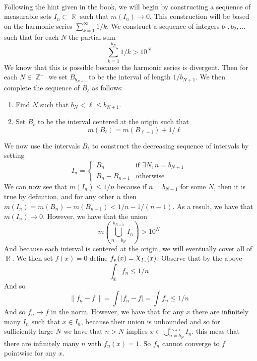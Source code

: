 \documentclass{article}
\DeclareMathOperator{\Z}{\mathbb{Z}}
\DeclareMathOperator{\R}{\mathbb{R}}
\DeclareMathOperator{\capchi}{\raisebox{2pt}{$\mathlarger{\mathlarger{\chi}}$}}
\newcommand{\problem}[1]{\noindent{\textbf{Problem #1}}\\}
\begin{document}
\problem{2.5.12} Following the hint given in the book, we will begin by constructing a sequence of measurable sets $I_n \subset \R$ such that $m(I_n) \to 0$. This construction will be based on the harmonic series $\sum_{k=1}^\infty 1/k$. We construct a sequence of integers $b_1,b_2,\ldots$ such that for each $N$ the partial sum
\[
\sum_{k=1}^{b_N} 1/k > 10^N
\]
We know that this is possible because the harmonic series is divergent. Then for each $N \in \Z^+$ we set $B_{b_{N+1}}$ to be the interval of length $1/b_{N+1}$. We then complete the sequence of $B_\ell$ as follows: 
\begin{enumerate}
\item Find $N$ such that $b_N < \ell \leq b_{N+1}$.
\item Set $B_\ell$ to be the interval centered at the origin such that 
\[
m(B_\ell) = m(B_{\ell-1}) + 1/\ell
\]
\end{enumerate}  
We now use the intervals $B_\ell$ to construct the decreasing sequence of intervals by setting
\[
I_n = 
\begin{cases}
B_n & \text{if }\exists N,  n = b_{N+1} \\
B_n - B_{n-1} & \text{otherwise}
\end{cases}
\]
We can now see that $m(I_n) \leq 1/n$ because if $n = b_{N+1}$ for some $N$, then it is true by definition, and for any other $n$ then $m(I_n) = m(B_n) - m(B_{n-1}) < 1/n - 1/(n-1)$. As a result, we have that $m(I_n) \to 0$. However, we have that the union 
\[
m\left(\bigcup_{n = b_{N}}^{b_{N+1}} I_n\right) > 10^N
\]
And because each interval is centered at the origin, we will eventually cover all of $\R$. We then set $f(x) = 0$ define $f_n(x) = \capchi_{I_n}(x)$. Observe that by the above 
\[
\int_{\R} f_n \leq 1/n
\]
And so 
\[
\| f_n - f\| = \int |f_n - f| = \int f_n \leq 1/n
\]
And so $f_n \to f$ in the norm. However, we have that for any $x$ there are infinitely many $I_n$ such that $x \in I_n$, because their union is unbounded and so for sufficiently large $N$ we have that $n > N$ implies $x \in \bigcup_{n = b_N}^{b_{N+1}} I_n$. this meas that there are infinitely many $n$ with $f_n(x) = 1$. So $f_n$ cannot converge to $f$ pointwise for any $x$. 
\end{document}
